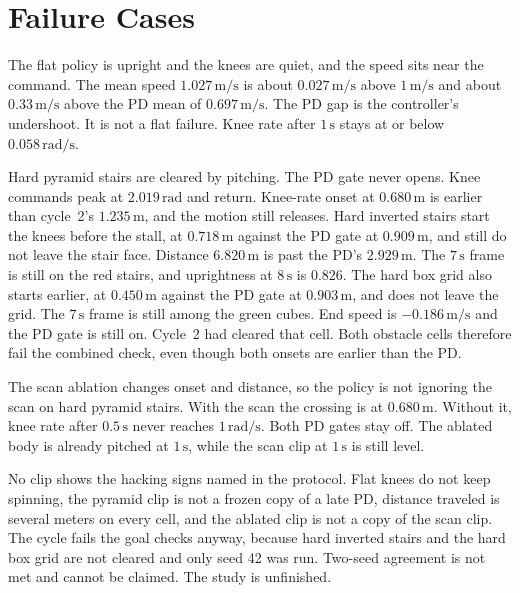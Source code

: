 \documentclass[11pt]{article}
\begin{document}
\section{Failure Cases}
\label{sec:failures}

The flat policy is upright and the knees are quiet, and the speed sits near the command.
The mean speed \(1.027\,\mathrm{m/s}\) is about \(0.027\,\mathrm{m/s}\) above \(1\,\mathrm{m/s}\) and about \(0.33\,\mathrm{m/s}\) above the PD mean of \(0.697\,\mathrm{m/s}\).
The PD gap is the controller's undershoot.
It is not a flat failure.
Knee rate after \(1\,\mathrm{s}\) stays at or below \(0.058\,\mathrm{rad/s}\).

Hard pyramid stairs are cleared by pitching.
The PD gate never opens.
Knee commands peak at \(2.019\,\mathrm{rad}\) and return.
Knee-rate onset at \(0.680\,\mathrm{m}\) is earlier than cycle~2's \(1.235\,\mathrm{m}\), and the motion still releases.
Hard inverted stairs start the knees before the stall, at \(0.718\,\mathrm{m}\) against the PD gate at \(0.909\,\mathrm{m}\), and still do not leave the stair face.
Distance \(6.820\,\mathrm{m}\) is past the PD's \(2.929\,\mathrm{m}\).
The \(7\,\mathrm{s}\) frame is still on the red stairs, and uprightness at \(8\,\mathrm{s}\) is \(0.826\).
The hard box grid also starts earlier, at \(0.450\,\mathrm{m}\) against the PD gate at \(0.903\,\mathrm{m}\), and does not leave the grid.
The \(7\,\mathrm{s}\) frame is still among the green cubes.
End speed is \(-0.186\,\mathrm{m/s}\) and the PD gate is still on.
Cycle~2 had cleared that cell.
Both obstacle cells therefore fail the combined check, even though both onsets are earlier than the PD.

The scan ablation changes onset and distance, so the policy is not ignoring the scan on hard pyramid stairs.
With the scan the crossing is at \(0.680\,\mathrm{m}\).
Without it, knee rate after \(0.5\,\mathrm{s}\) never reaches \(1\,\mathrm{rad/s}\).
Both PD gates stay off.
The ablated body is already pitched at \(1\,\mathrm{s}\), while the scan clip at \(1\,\mathrm{s}\) is still level.

No clip shows the hacking signs named in the protocol.
Flat knees do not keep spinning, the pyramid clip is not a frozen copy of a late PD, distance traveled is several meters on every cell, and the ablated clip is not a copy of the scan clip.
The cycle fails the goal checks anyway, because hard inverted stairs and the hard box grid are not cleared and only seed 42 was run.
Two-seed agreement is not met and cannot be claimed.
The study is unfinished.
\end{document}
